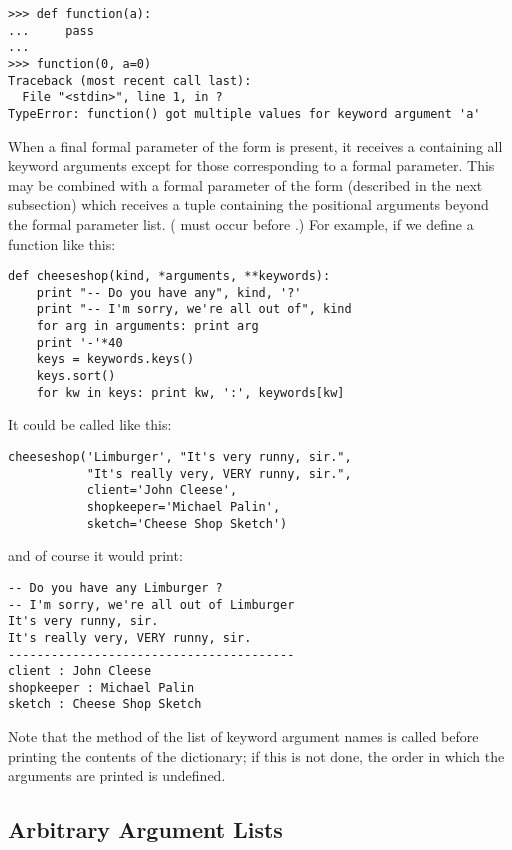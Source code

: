 \documentclass{manual}
\begin{document}
\begin{verbatim}
>>> def function(a):
...     pass
... 
>>> function(0, a=0)
Traceback (most recent call last):
  File "<stdin>", line 1, in ?
TypeError: function() got multiple values for keyword argument 'a'
\end{verbatim}

When a final formal parameter of the form  is
present, it receives a 
containing all keyword arguments except for those corresponding to
a formal parameter.  This may be
combined with a formal parameter of the form
 (described in the next subsection) which receives a
tuple containing the positional arguments beyond the formal parameter
list.  ( must occur before .)
For example, if we define a function like this:

\begin{verbatim}
def cheeseshop(kind, *arguments, **keywords):
    print "-- Do you have any", kind, '?'
    print "-- I'm sorry, we're all out of", kind
    for arg in arguments: print arg
    print '-'*40
    keys = keywords.keys()
    keys.sort()
    for kw in keys: print kw, ':', keywords[kw]
\end{verbatim}

It could be called like this:

\begin{verbatim}
cheeseshop('Limburger', "It's very runny, sir.",
           "It's really very, VERY runny, sir.",
           client='John Cleese',
           shopkeeper='Michael Palin',
           sketch='Cheese Shop Sketch')
\end{verbatim}

and of course it would print:

\begin{verbatim}
-- Do you have any Limburger ?
-- I'm sorry, we're all out of Limburger
It's very runny, sir.
It's really very, VERY runny, sir.
----------------------------------------
client : John Cleese
shopkeeper : Michael Palin
sketch : Cheese Shop Sketch
\end{verbatim}

Note that the  method of the list of keyword argument
names is called before printing the contents of the 
dictionary; if this is not done, the order in which the arguments are
printed is undefined.


\subsection{Arbitrary Argument Lists \label{arbitraryArgs}}
\end{document}
